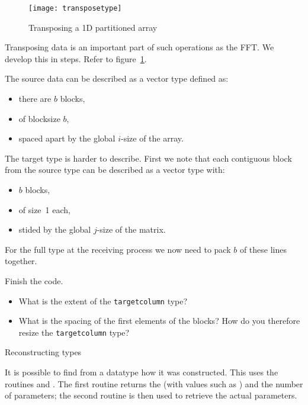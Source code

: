 \begin{figure}[ht]
  \texttt{[image: transposetype]}
  \caption{Transposing a 1D partitioned array}
  \label{fig:transposetype} 
\end{figure}
Transposing data is an important part of such operations as the \ac{FFT}.
We develop this in steps. Refer to figure~\ref{fig:transposetype}.

The source data can be described as a vector type defined as:
\begin{itemize}
\item there are $b$ blocks,
\item of blocksize $b$,
\item spaced apart by the global $i$-size of the array.
\end{itemize}

The target type is harder to describe.
First we note that each contiguous block from the source type
can be described as a vector type with:
\begin{itemize}
\item $b$ blocks,
\item of size~1 each,
\item stided by the global $j$-size of the matrix.
\end{itemize}
%

For the full type at the receiving process we now need to pack
$b$ of these lines together.

\begin{exercise}
  Finish the code.
  \begin{itemize}
  \item
    What is the extent of the \lstinline{targetcolumn} type?
  \item What is the spacing of the first elements of the blocks? How
    do you therefore resize the \lstinline{targetcolumn} type?
  \end{itemize}
\end{exercise}


 {Reconstructing types}

It is possible to find from a datatype how it was constructed.
This uses the routines
 and
.
The first routine returns the 
(with values such as )
and the number of parameters;
the second routine is then used to retrieve the actual parameters.

